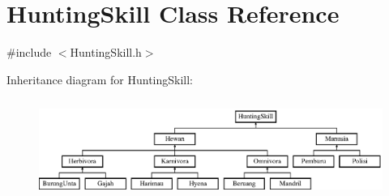 \hypertarget{class_hunting_skill}{}\section{Hunting\+Skill Class Reference}
\label{class_hunting_skill}


{\ttfamily \#include $<$Hunting\+Skill.\+h$>$}

Inheritance diagram for Hunting\+Skill\+:\begin{figure}[H]
\begin{center}
\leavevmode
\includegraphics[height=3.255814cm]{class_hunting_skill}
\end{center}
\end{figure}

